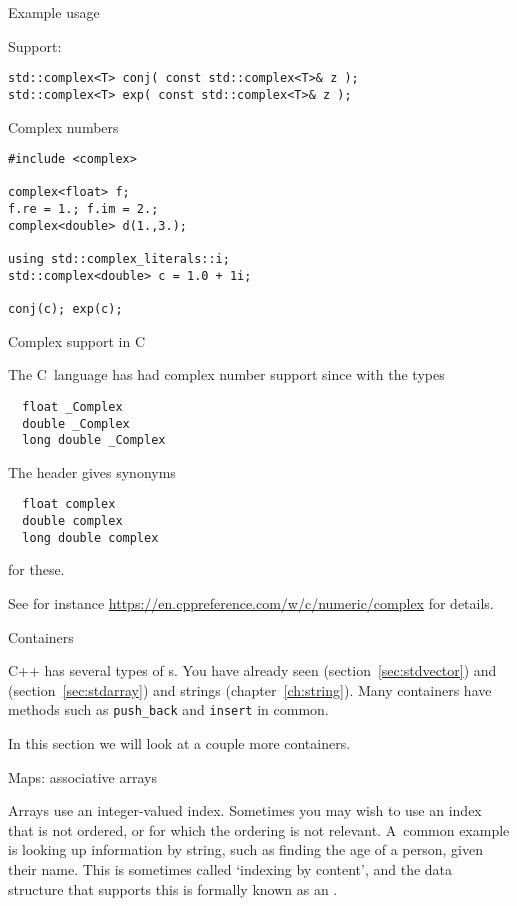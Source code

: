 \begin{block}{Example usage}
  \label{sl:complexvec}
\end{block}

Support:
\begin{lstlisting}
std::complex<T> conj( const std::complex<T>& z );
std::complex<T> exp( const std::complex<T>& z );
\end{lstlisting}

\begin{slide}{Complex numbers}
  \label{sl-complex}
\begin{lstlisting}
#include <complex>

complex<float> f;
f.re = 1.; f.im = 2.;
complex<double> d(1.,3.);

using std::complex_literals::i;
std::complex<double> c = 1.0 + 1i;

conj(c); exp(c);
\end{lstlisting}
\end{slide}

 {Complex support in C}

The C~language has had complex number support
since  with the types
\begin{lstlisting}
  float _Complex
  double _Complex
  long double _Complex
\end{lstlisting}
The header 
gives synonyms
\begin{lstlisting}
  float complex
  double complex
  long double complex
\end{lstlisting}
for these.

See for instance \url{https://en.cppreference.com/w/c/numeric/complex}
for details.

 {Containers}

C++ has several types of s.
You have already seen 
(section~\ref{sec:stdvector})
and 
(section~\ref{sec:stdarray})
and strings (chapter~\ref{ch:string}).
Many containers have 
methods such as \lstinline{push_back} and \lstinline{insert} in common.

In this section we will look at a couple more containers.

 {Maps: associative arrays}
\label{sec:map}

Arrays use an integer-valued index. Sometimes you may wish to use an
index that is not ordered, or for which the ordering is not relevant.
A~common example is looking up information by string, such as finding
the age of a person, given their name. This is sometimes called
`indexing by content', and the data structure that supports this is
formally known as an .

